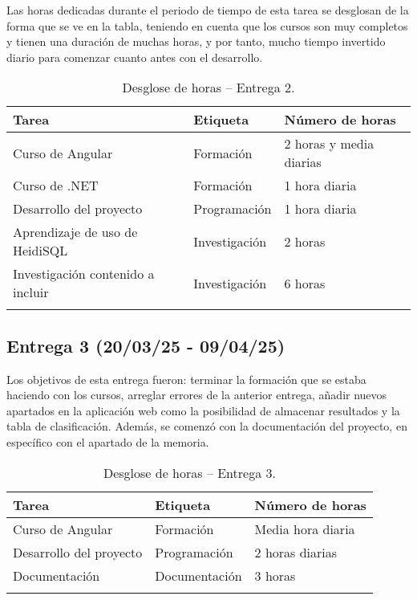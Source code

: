 Las horas dedicadas durante el periodo de tiempo de esta tarea se desglosan de la forma que se ve en la tabla, teniendo en cuenta que los cursos son muy completos y tienen una duración de muchas horas, y por tanto, mucho tiempo invertido diario para comenzar cuanto antes con el desarrollo.

\begin{longtable}{@{}lll@{}}
  \toprule
  \rowcolor{gray!20}
  Tarea & Etiqueta & Número de horas \\ 
  \midrule
  \endhead
  Curso de Angular  & Formación  & 2 horas y media diarias \\ 
  \midrule

  Curso de .NET  &  Formación    &   1 hora diaria \\ 
  \midrule

  Desarrollo del proyecto  &  Programación  & 1 hora diaria \\ 
  \midrule

  Aprendizaje de uso de HeidiSQL  &  Investigación  &  2 horas \\ 
  \midrule

  Investigación contenido a incluir  &  Investigación  &  6 horas \\ 
  \midrule

  \bottomrule
  \caption{Desglose de horas -- Entrega 2.}
\end{longtable}


\subsection{Entrega 3 (20/03/25 - 09/04/25)}

Los objetivos de esta entrega fueron: terminar la formación que se estaba haciendo con los cursos, arreglar errores de la anterior entrega, añadir nuevos apartados en la aplicación web como la posibilidad de almacenar resultados y la tabla de clasificación. Además, se comenzó con la documentación del proyecto, en específico con el apartado de la memoria.

\begin{longtable}{@{}lll@{}}
  \toprule
  \rowcolor{gray!20}
  Tarea & Etiqueta & Número de horas \\ 
  \midrule
  \endhead
  Curso de Angular  & Formación  & Media hora diaria \\ 
  \midrule

  Desarrollo del proyecto  &  Programación  &  2 horas diarias \\ 
  \midrule

  Documentación  &  Documentación  &  3 horas \\ 
  \midrule

  \bottomrule
  \caption{Desglose de horas -- Entrega 3.}
\end{longtable}


